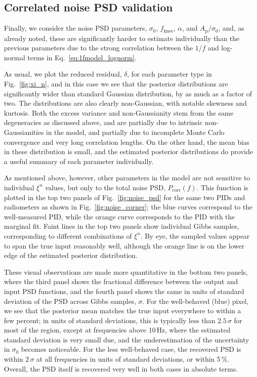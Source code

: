 \documentclass[twocolumn]{aa}%
\begin{document}
\subsection{Correlated noise PSD validation}
\label{sec:corr_psd}

Finally, we consider the noise PSD parameters, $\sigma_0$,
$f_\mathrm{knee}$, $\alpha$, and $A_\mathrm{p}/\sigma_0$, and, as
already noted, these are significantly harder to estimate individually
than the previous parameters due to the strong correlation between the
$1/f$ and log-normal terms in Eq.~\eqref{eq:1fmodel_lognorm}.

As usual, we plot the reduced residual, $\delta$, for each parameter
type in Fig.~\ref{fig:xi_n}, and in this case we see that the
posterior distributions are significantly wider than standard Gaussian
distribution, by as much as a factor of two. The distributions are
also clearly non-Gaussian, with notable skewness and
kurtosis. Both the excess variance and non-Gaussianity stem from the
same degeneracies as discussed above, and are partially due to
intrinsic non-Gaussianities in the model, and partially due to
incomplete Monte Carlo convergence and very long correlation
lengths. On the other hand, the mean bias in these distribution is
small, and the estimated posterior distributions do provide a useful
summary of each parameter individually.

As mentioned above, however, other parameters in the model are not
sensitive to individual $\xi^n$ values, but only to the total
noise PSD, $P_\mathrm{corr}(f)$. This function is plotted in
the top two panels of Fig.~\ref{fig:noise_psd} for the same two PIDs and radiometers as shown in
Fig.~\ref{fig:noise_corner}; the blue curves correspond to the
well-measured PID, while the orange curve corresponds to the PID with
the marginal fit. Faint lines in the top two panels show individual
Gibbs samples, corresponding to different combinations of $\xi^n$. By
eye, the sampled values appear to span the true input reasonably well,
although the orange line is on the lower edge of the estimated
posterior distribution.

These visual observations are made more quantitative in the bottom two
panels, where the third panel shows the fractional difference between
the output and input PSD functions, and the fourth
panel shows the same in units of standard deviation of the PSD across 
Gibbs samples, $\sigma$. For the well-behaved (blue)
pixel, we see that the posterior mean matches the true input
everywhere to within a few percent; in units of standard deviations,
this is typically less than $2.5\,\sigma$ for most of the region,
except at frequencies above 10\,Hz, where the estimated standard
deviation is very small due, and the underestimation of the
uncertainty in $\sigma_0$ becomes noticeable. For the less
well-behaved case, the recovered PSD is within $2\,\sigma$ at all
frequencies in units of standard deviations, or within 5\,\%. Overall,
the PSD itself is recovered very well in both cases in absolute terms.
\end{document}
